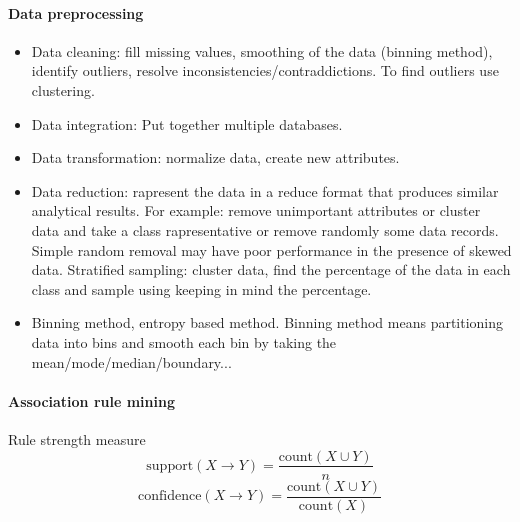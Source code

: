 \documentclass[10pt,oneside,a4paper]{article}
\begin{document}

\paragraph{Data preprocessing}
\begin{itemize}
    \item Data cleaning: fill missing values, smoothing of the data (binning method), identify outliers, resolve inconsistencies/contraddictions.
          To find outliers use clustering.
    \item Data integration: Put together multiple databases.
    \item Data transformation: normalize data, create new attributes.
    \item Data reduction: rapresent the data in a reduce format that produces similar analytical results. For example: remove unimportant attributes or cluster data and take a class rapresentative or remove randomly some data records. Simple random removal may have poor performance in the presence of skewed data. Stratified sampling: cluster data, find the percentage of the data in each class and sample using keeping in mind the percentage.
    \item Binning method, entropy based method.
          Binning method means partitioning data into bins and smooth each bin by taking the mean/mode/median/boundary...
\end{itemize}


\paragraph{Association rule mining}
Rule strength measure
\[
    \text{support}(X \rightarrow Y) = \frac{\text{count}(X \cup Y)}{n}
\]
\[
    \text{confidence}(X \rightarrow Y) = \frac{\text{count}(X \cup Y)}{\text{count}(X)}
\]
\end{document}
